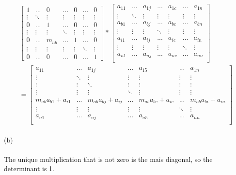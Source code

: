 \documentclass[10pt,a4paper]{article}
\begin{document}
	\begin{align*}
	\begin{bmatrix}
		1&...&0&...&0&...&0\\
		\vdots&\ddots&\vdots&\vdots&\vdots&\vdots&\vdots\\
		0&...&1&...&0&...&0\\
		\vdots&\vdots&\vdots&\ddots&\vdots&\vdots&\vdots\\
		0&...&m_{ab}&...&1&...&0\\
		\vdots&\vdots&\vdots&\vdots&\vdots&\ddots&\vdots\\		
		0&...&0&...&0&...&1
	\end{bmatrix} * \begin{bmatrix}
		a_{11}&...&a_{1j}&...&a_{1c}&...&a_{1n}\\
		\vdots&\ddots&\vdots&\vdots&\vdots&\vdots&\vdots\\
		a_{b1}&...&a_{bj}&...&a_{bc}&...&a_{bn}\\		
		\vdots&\vdots&\vdots&\ddots&\vdots&\vdots&\vdots\\
		a_{i1}&...&a_{ij}&...&a_{ic}&...&a_{in}\\		
		\vdots&\vdots&\vdots&\vdots&\vdots&\ddots&\vdots\\		
		a_{n1}&...&a_{nj}&...&a_{nc}&...&a_{nn}\\		
	\end{bmatrix} \\ = \begin{bmatrix}
		a_{11}&...&a_{1j}&...&a_{15}&...&a_{1n}\\
		\vdots&\ddots&\vdots&\vdots&\vdots&\vdots&\vdots\\
		\vdots&\vdots&\ddots&\vdots&\vdots&\vdots&\vdots\\		
		\vdots&\vdots&\vdots&\ddots&\vdots&\vdots&\vdots\\
		m_{ab}a_{b1}+a_{i1}&...&m_{ab}a_{bj}+a_{ij}&...&m_{ab}a_{bc}+a_{ic}&...&m_{ab}a_{bi}+a_{in}\\		
		\vdots&\vdots&\vdots&\vdots&\vdots&\ddots&\vdots\\		
		a_{n1}&...&a_{nj}&...&a_{n5}&...&a_{nn}\\		
	\end{bmatrix}
	\end{align*}
	 \\
	 (b)\\
	 \\
	 The unique multiplication that is not zero is the mais diagonal, so the determinant is 1.\\
	 \\
\end{document}

